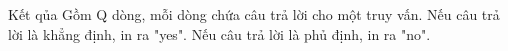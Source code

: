 Kết qủa
Gồm Q dòng, mỗi dòng chứa câu trả lời cho một truy vấn. Nếu câu trả lời là khẳng định, in ra "yes". Nếu câu trả lời là phủ định, in ra "no".